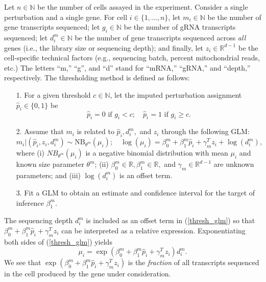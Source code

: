 \documentclass[12pt]{article}
\begin{document}
Let $n \in \mathbb{N}$ be the number of cells assayed in the experiment. Consider a single perturbation and a single gene. For cell $i \in \{1, \dots, n\}$, let $m_i \in \mathbb{N}$ be the number of gene transcripts sequenced; let $g_i \in \mathbb{N}$ be the number of gRNA transcripts sequenced; let $d^m_i \in \mathbb{N}$ be the number of gene transcripts sequenced across \textit{all} genes (i.e., the library size or sequencing depth); and finally, let $z_i \in \mathbb{R}^{d-1}$ be the cell-specific technical factors (e.g., sequencing batch, percent mitochondrial reads, etc.) The letters ``m,'' ``g'', and ``d'' stand for ``mRNA,'' ``gRNA,'' and ``depth,'' respectively. The thresholding method is defined as follows:
\begin{itemize}
	\item[1.] For a given threshold $c \in \mathbb{N}$, let the imputed perturbation assignment $\hat{p}_i \in \{0, 1\}$ be $$ \hat{p}_i = 0 \textrm{ if } g_i < c; \quad \hat{p}_i = 1 \textrm{ if } g_i \geq c.$$
	\item[2.] Assume that $m_i$ is related to $\hat{p}_i, d^m_i,$ and $z_i$ through the following GLM:
	\begin{equation}\label{thresh_glm}
	m_i | (\hat{p}_i, z_i, d^m_i) \sim \textrm{NB}_{\theta^m}(\mu_i); \quad
	\log(\mu_i) = \beta^m_0 + \beta^m_1 \hat{p}_i + \gamma^T_m z_i + \log\left(d_i^m\right),
	\end{equation}
	where (i) $NB_{\theta^m}(\mu_i)$ is a negative binomial distribution with mean $\mu_i$ and known size parameter $\theta^m$; (ii) $\beta^m_0 \in \mathbb{R}, \beta^m_1 \in \mathbb{R},$ and $\gamma_m \in  \mathbb{R}^{d-1}$ are unknown parameters; and (iii) $\log(d_i^m)$ is an offset term.
	
	\item[3.]  Fit a GLM to obtain an estimate and confidence interval for the target of inference $\beta^m_1$.
\end{itemize}
The sequencing depth $d^m_i$ is included as an offset term in (\ref{thresh_glm}) so that $\beta^m_0 + \beta^m_1 \hat{p}_i + \gamma^T_m z_i$ can be interpreted as a relative expression. Exponentiating both sides of (\ref{thresh_glm}) yields
$$\mu_i = \exp \left( \beta^m_0 + \beta^m_1 \hat{p}_i + \gamma^T_m z_i \right) d_i^m.$$ We see that $\exp \left( \beta^m_0 + \beta^m_1 \hat{p}_i + \gamma^T_m z_i \right)$ is the \textit{fraction} of all transcripts sequenced in the cell produced by the gene under consideration.
\end{document}
